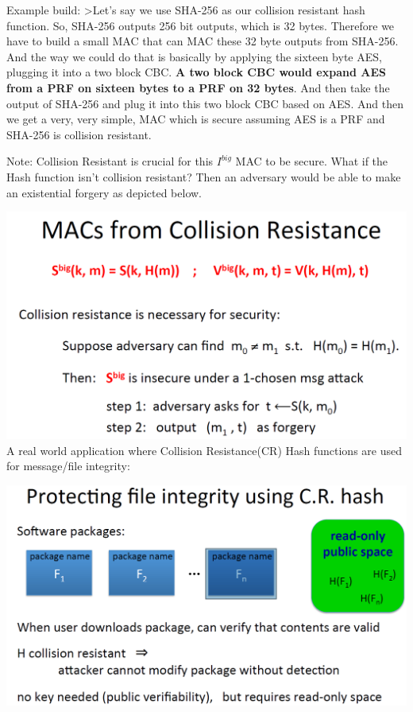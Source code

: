\documentclass[11pt]{article}
\makeatletter
\def\maxwidth{\ifdim\Gin@nat@width>\linewidth\linewidth
    \else\Gin@nat@width\fi}
\let\Oldincludegraphics\includegraphics
\renewcommand{\includegraphics}[1]{\Oldincludegraphics[width=.8\maxwidth]{#1}}
\makeatother
\begin{document}
Example build: \textgreater{}Let's say we use SHA-256 as our collision
resistant hash function. So, SHA-256 outputs 256 bit outputs, which is
32 bytes. Therefore we have to build a small MAC that can MAC these 32
byte outputs from SHA-256. And the way we could do that is basically by
applying the sixteen byte AES, plugging it into a two block CBC.
\textbf{A two block CBC would expand AES from a PRF on sixteen bytes to
a PRF on 32 bytes}. And then take the output of SHA-256 and plug it into
this two block CBC based on AES. And then we get a very, very simple,
MAC which is secure assuming AES is a PRF and SHA-256 is collision
resistant.

Note: Collision Resistant is crucial for this \(I^{big}\) MAC to be
secure. What if the Hash function isn't collision resistant? Then an
adversary would be able to make an existential forgery as depicted
below.

\includegraphics{./Images/InsecureMACfromHash.png} A real world
application where Collision Resistance(CR) Hash functions are used for
message/file integrity:

\includegraphics{./Images/ApplicationCRHash.png}
\end{document}
